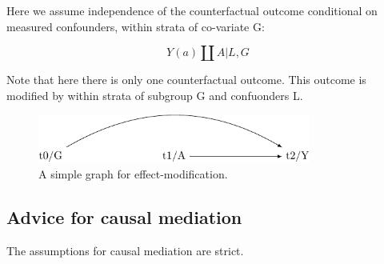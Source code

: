 \documentclass[
  singlecolumn]{report}
\begin{document}
Here we assume independence of the counterfactual outcome conditional on
measured confounders, within strata of co-variate G:

\[Y(a) \coprod A | L, G\]

Note that here there is only one counterfactual outcome. This outcome is
modified by within strata of subgroup G and confuonders L.

\begin{figure}

{\centering \includegraphics[width=0.8\textwidth,height=\textheight]{causal-dags_files/figure-pdf/fig-dag-effect-modfication-1.pdf}

}

\caption{\label{fig-dag-effect-modfication}A simple graph for
effect-modification.}

\end{figure}

\hypertarget{advice-for-causal-mediation}{%
\subsection{Advice for causal
mediation}\label{advice-for-causal-mediation}}

The assumptions for causal mediation are strict.
\end{document}
